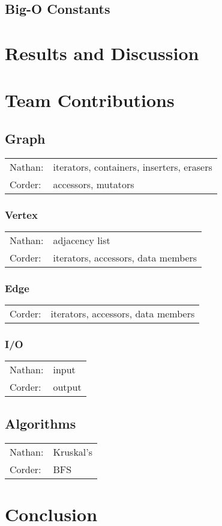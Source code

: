 \documentclass[titlepage]{article}
\begin{document}
\begin{multicols*}{2}
            \subsection{Big-O Constants}
        \section{Results and Discussion}
        \section{Team Contributions}
            \subsection{Graph}
                \begin{tabular}{l l}
                    Nathan: & iterators, containers, inserters, erasers \\
                    Corder: & accessors, mutators
                \end{tabular}
            \subsubsection{Vertex}
                \begin{tabular}{l l}
                    Nathan: & adjacency list \\
                    Corder: & iterators, accessors, data members
                \end{tabular}
            \subsubsection{Edge}
                \begin{tabular}{l l}
                Corder: & iterators, accessors, data members
                \end{tabular}
            \subsubsection{I/O}
                \begin{tabular}{l l}
                   Nathan: & input \\
                   Corder: & output
                \end{tabular}
            \subsection{Algorithms}
                \begin{tabular}{l l}
                    Nathan: & Kruskal's \\
                    Corder: & BFS
                \end{tabular}
        \section{Conclusion}
    \end{multicols*}
\end{document}
